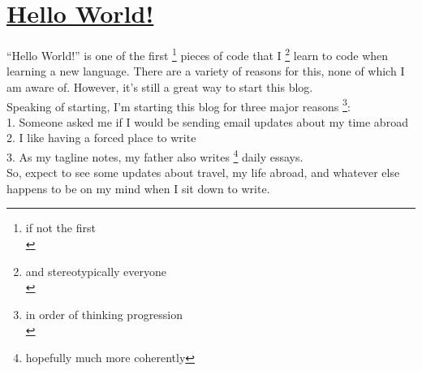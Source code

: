 \hypertarget{hello-world}{%
\section{\href{hello-world.html}{Hello World!}}\label{hello-world}}

``Hello World!'' is one of the first \footnote{if not the first\\}
pieces of code that I \footnote{and stereotypically everyone\\} learn to
code when learning a new language. There are a variety of reasons for
this, none of which I am aware of. However, it's still a great way to
start this blog.\\
Speaking of starting, I'm starting this blog for three major reasons
\footnote{in order of thinking progression\\}:\\
1. Someone asked me if I would be sending email updates about my time
abroad \\
2. I like having a forced place to write \\
3. As my tagline notes, my father also writes \footnote{hopefully much
  more coherently} daily essays. \\
So, expect to see some updates about travel, my life abroad, and
whatever else happens to be on my mind when I sit down to write.
